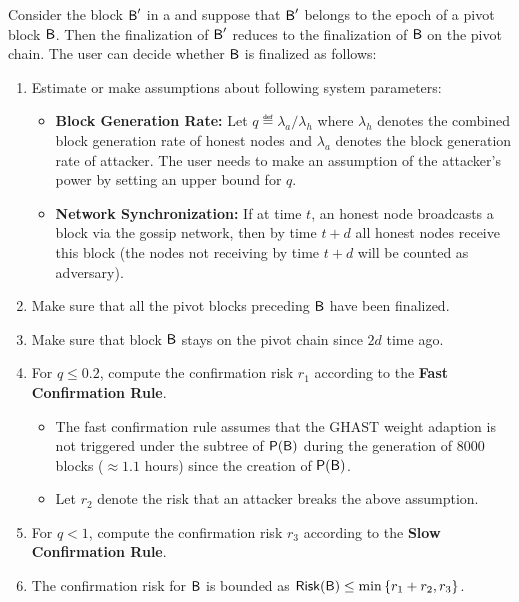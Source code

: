 Consider the block $\textsf{B}'$ in a \tg and suppose that $\textsf{B}'$ belongs to the epoch of a pivot block $\textsf{B}$.
Then the finalization of $\textsf{B}'$ reduces to the finalization of $\textsf{B}$ on the pivot chain.
The user can decide whether $\textsf{B}$ is finalized as follows:
\begin{enumerate}%
	\item Estimate or make assumptions about following system parameters:
	\begin{itemize}[nosep]
	 	\item \textbf{Block Generation Rate:} Let $q\eqdef\lambda_a/\lambda_h$ where $\lambda_h$ denotes the combined block generation rate of honest nodes and $\lambda_a$ denotes the block generation rate of attacker. 
	 	The user needs to make an assumption of the attacker's power by setting an upper bound for $q$.

	 	\item \textbf{Network Synchronization:} If at time $t$, an honest node broadcasts a block via the gossip network, then by time $t + d$ all honest nodes receive this block (the nodes not receiving by time $t+d$ will be counted as adversary). 
	\end{itemize} 

	\item Make sure that all the pivot blocks preceding $\textsf{B}$ have been finalized.

	\item Make sure that block $\textsf{B}$ stays on the pivot chain since $2d$ time ago.

	\item For $q\le 0.2$, compute the confirmation risk $r_1$ according to the \textbf{Fast Confirmation Rule}. 
	\begin{itemize}[nosep]
		\item The fast confirmation rule assumes that the GHAST weight adaption is not triggered under the subtree of $\mathsf{P}{\left({\textsf{B}} \right)}$ during the generation of $8000$  blocks ($\approx 1.1$ hours) since the creation of $\mathsf{P}{\left({\textsf{B}} \right)}$.

		\item Let $r_2$ denote the risk that an attacker breaks the above assumption.
	\end{itemize}
	
	
	\item For $q< 1$, compute the confirmation risk $r_3$ according to the \textbf{Slow Confirmation Rule}.

	\item The confirmation risk for $\textsf{B}$ is bounded as $\mathsf{Risk}(\textsf{B})\le \min{\left \{{r_1+r_2,r_3} \right \}}$. 
\end{enumerate}


